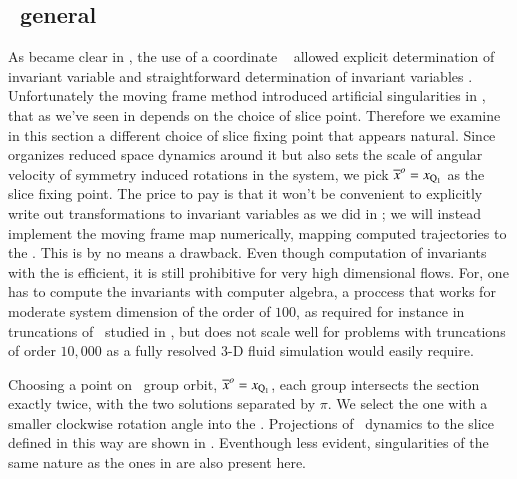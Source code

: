 
\subsection{\label{s:mfReqb}\CLe\  general \slice}

As became clear in , the use of a coordinate \slice\ 
allowed explicit determination of invariant variable  and straightforward
determination of invariant variables . Unfortunately the moving frame
method introduced artificial singularities in \reducedsp, that as we've seen in 
depends on the choice of slice point.
Therefore we examine in this section a different choice of slice fixing point that appears natural.
Since  organizes reduced space dynamics around it but also sets the
scale of angular velocity of symmetry induced rotations in the system, we
pick ${\overline{x}^o}=x_{\mathrm{Q}_{1}}$ as the slice fixing point.
The price to pay is that it won't be convenient to explicitly write out
transformations to invariant variables
as we did in ; we will instead implement the moving frame map numerically,
mapping computed trajectories to the \slice.
This is by no means a drawback. Even though computation of invariants with the
{\mframes} is efficient, it is still
prohibitive for very high dimensional flows. For, one has
to compute the invariants with computer algebra, a proccess
that works for moderate system dimension of the order of $100$,
as required for instance in truncations of \KSe\ studied in ,
but does not scale well for problems with truncations of order $10,000$ as
a fully resolved $3$-D fluid simulation would easily require.


Choosing a point on \reqv\ group orbit,
${\overline{x}^o}  = x_{\mathrm{Q}_{1}}$,
each group intersects the section exactly twice, with the
two solutions separated by $\pi$. We select the one with a
smaller clockwise rotation angle into the \slice.
Projections of \cLe\ dynamics to the slice defined in this way are
shown in \reffig{fig:CLEmfReqb1}. Eventhough less evident, singularities
of the same nature as the ones in \refsect{s:cleCoordSlice} are also present
here.


